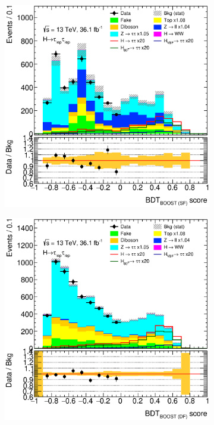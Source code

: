 \begin{figure}[htb]
\begin{subfigure}[t]{0.45\textwidth}
    \end{subfigure}
    \begin{subfigure}[t]{0.45\textwidth}
        \includegraphics[width=\textwidth]{./plots/mva/modeling/BDT/SR/eemm-CutMVABoostedCatSF-BDT_BOOST_SF-lin.eps}
    \end{subfigure}
    \begin{subfigure}[t]{0.45\textwidth}
        \includegraphics[width=\textwidth]{./plots/mva/modeling/BDT/SR/emme-CutMVABoostedCatDF-BDT_BOOST_DF-lin.eps}

\end{subfigure}
\end{figure}
